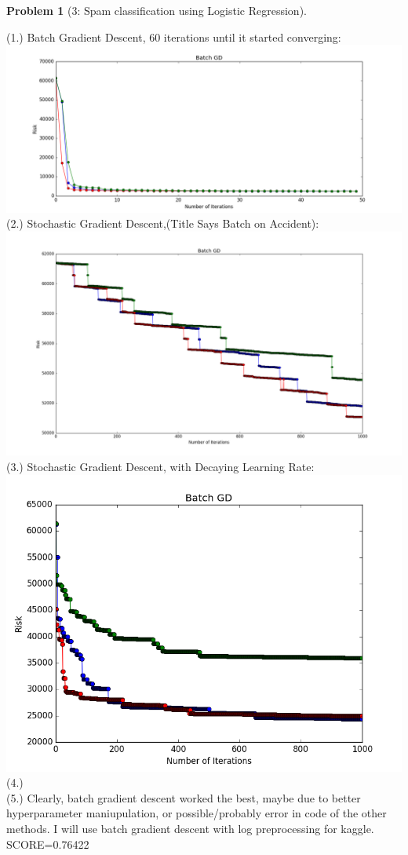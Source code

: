 \documentclass[11pt]{article}
\theoremstyle{quest}
\newtheorem*{question}{Problem}
\begin{document}
\newpage
\begin{question}[3: Spam classification using Logistic Regression] \end{question}

\subitem(1.) Batch Gradient Descent, 60 iterations until it started converging:\\
	\includegraphics[scale=.5]{batch_gd}
\subitem(2.) Stochastic Gradient Descent,(Title Says Batch on Accident):\\
	\includegraphics[scale=.43]{stochastic}\\[10ex]
\subitem(3.) Stochastic Gradient Descent, with Decaying Learning Rate:\\
	\includegraphics[scale=.6]{stochastic_decay}\\[3ex]
\subitem(4.)\\[3ex]
\subitem(5.) Clearly, batch gradient descent worked the best, maybe due to better hyperparameter maniupulation, or possible/probably error in code of the other methods. I will use batch gradient descent with log preprocessing for kaggle. SCORE=0.76422
\end{document}
